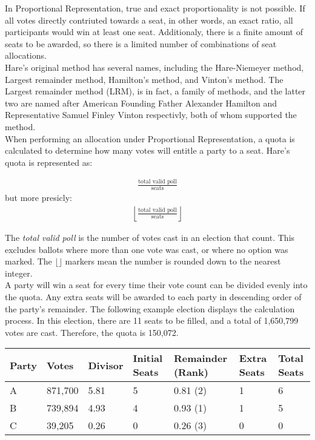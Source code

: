 \documentclass{article}
\begin{document}
    In Proportional Representation, true and exact proportionality is not possible. If all votes directly contriuted towards a seat, in other words, an exact ratio, all participants would win at least one seat. Additionaly, there is a finite amount of seats to be awarded, so there is a limited number of combinations of seat allocations. \\

    Hare's original method has several names, including the Hare-Niemeyer method, Largest remainder method, Hamilton's method, and Vinton's method. The Largest remainder method (LRM), is in fact, a family of methods, and the latter two are named after American Founding Father Alexander Hamilton and Representative Samuel Finley Vinton respectivly, both of whom supported the method. \\

    When performing an allocation under Proportional Representation, a quota is calculated to determine how many votes will entitle a party to a seat. Hare's quota is represented as:

    \begin{align}
        \frac{\text{total valid poll}}{\text{seats}}
    \end{align}
    but more presicly:
    \begin{align}
        \left \lfloor \frac{\text{total valid poll}}{\text{seats}} \right \rfloor
    \end{align}

    The \textit{total valid poll} is the number of votes cast in an election that count. This excludes ballots where more than one vote was cast, or where no option was marked. The $\lfloor \rfloor$ markers mean the number is rounded down to the nearest integer.\\

    A party will win a seat for every time their vote count can be divided evenly into the quota. Any extra seats will be awarded to each party in descending order of the party's remainder. The following example election displays the calculation process. In this election, there are 11 seats to be filled, and a total of 1,650,799 votes are cast. Therefore, the quota is 150,072.\\

    \begin{adjustbox}{center}
    \begin{tabular}{ |l|l|l|l|l|l|l| }
        \hline
        Party & Votes & Divisor & Initial Seats & Remainder (Rank) & Extra Seats & Total Seats \\
        \hline
        A & 871,700 & 5.81 & 5 & 0.81 (2) & 1 & 6 \\
        \hline
        B & 739,894 & 4.93 & 4 & 0.93 (1) & 1 & 5 \\
        \hline
        C & 39,205 & 0.26 & 0 & 0.26 (3) & 0 & 0 \\
        \hline
    \end{tabular}
    \end{adjustbox}\\
    
\end{document}
